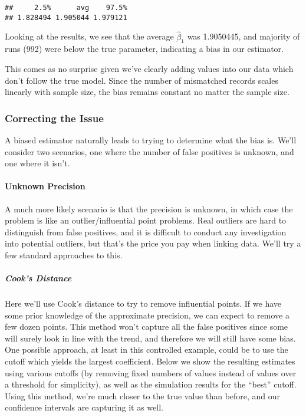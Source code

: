 \documentclass[
]{article}
\begin{document}
\begin{verbatim}
##     2.5%      avg    97.5% 
## 1.828494 1.905044 1.979121
\end{verbatim}

Looking at the results, we see that the average \(\hat \beta_1\) was
1.9050445, and majority of runs (992) were below the true parameter,
indicating a bias in our estimator.

This comes as no surprise given we've clearly adding values into our
data which don't follow the true model. Since the number of mismatched
records scales linearly with sample size, the bias remains constant no
matter the sample size.

\hypertarget{correcting-the-issue}{%
\subsubsection{Correcting the Issue}\label{correcting-the-issue}}

A biased estimator naturally leads to trying to determine what the bias
is. We'll consider two scenarios, one where the number of false
positives is unknown, and one where it isn't.

\hypertarget{unknown-precision}{%
\paragraph{Unknown Precision}\label{unknown-precision}}

A much more likely scenario is that the precision is unknown, in which
case the problem is like an outlier/influential point problems. Real
outliers are hard to distinguish from false positives, and it is
difficult to conduct any investigation into potential outliers, but
that's the price you pay when linking data. We'll try a few standard
approaches to this.

\hypertarget{cooks-distance}{%
\subparagraph{Cook's Distance}\label{cooks-distance}}

Here we'll use Cook's distance to try to remove influential points. If
we have some prior knowledge of the approximate precision, we can expect
to remove a few dozen points. This method won't capture all the false
positives since some will surely look in line with the trend, and
therefore we will still have some bias. One possible approach, at least
in this controlled example, could be to use the cutoff which yields the
largest coefficient. Below we show the resulting estimates using various
cutoffs (by removing fixed numbers of values instead of values over a
threshold for simplicity), as well as the simulation results for the
``best'' cutoff. Using this method, we're much closer to the true value
than before, and our confidence intervals are capturing it as well.
\end{document}
